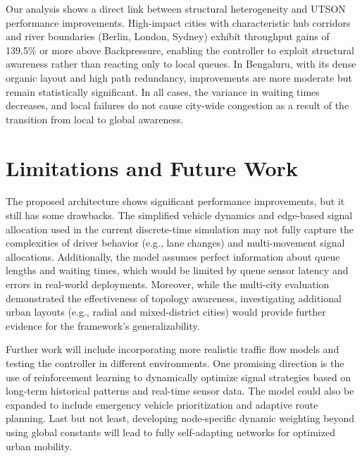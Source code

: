 \documentclass[letterpaper, conference]{IEEEtran}
\begin{document}
Our analysis shows a direct link between structural heterogeneity and UTSON performance improvements. High-impact cities with characteristic hub corridors and river boundaries (Berlin, London, Sydney) exhibit throughput gains of 139.5\% or more above Backpressure, enabling the controller to exploit structural awareness rather than reacting only to local queues. In Bengaluru, with its dense organic layout and high path redundancy, improvements are more moderate but remain statistically significant. In all cases, the variance in waiting times decreases, and local failures do not cause city-wide congestion as a result of the transition from local to global awareness.

\section{Limitations and Future Work}
\label{limit_and_fut_work}
The proposed architecture shows significant performance improvements, but it still has some drawbacks. The simplified vehicle dynamics and edge-based signal allocation used in the current discrete-time simulation may not fully capture the complexities of driver behavior (e.g., lane changes) and multi-movement signal allocations. Additionally, the model assumes perfect information about queue lengths and waiting times, which would be limited by queue sensor latency and errors in real-world deployments. Moreover, while the multi-city evaluation demonstrated the effectiveness of topology awareness, investigating additional urban layouts (e.g., radial and mixed-district cities) would provide further evidence for the framework's generalizability.

Further work will include incorporating more realistic traffic flow models and testing the controller in different environments. One promising direction is the use of reinforcement learning to dynamically optimize signal strategies based on long-term historical patterns and real-time sensor data. The model could also be expanded to include emergency vehicle prioritization and adaptive route planning. Last but not least, developing node-specific dynamic weighting beyond using global constants will lead to fully self-adapting networks for optimized urban mobility.

\end{document}
